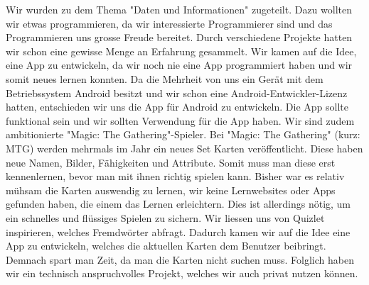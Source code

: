 Wir wurden zu dem Thema "Daten und Informationen" zugeteilt. Dazu wollten wir etwas programmieren, da wir interessierte Programmierer sind und das Programmieren uns grosse Freude bereitet. Durch verschiedene Projekte hatten wir schon eine gewisse Menge an Erfahrung gesammelt. Wir kamen auf die Idee, eine App zu entwickeln, da wir noch nie eine App programmiert haben und wir somit neues lernen konnten. Da die Mehrheit von uns ein Ger\"at mit dem Betriebssystem Android besitzt und wir schon eine Android-Entwickler-Lizenz hatten, entschieden wir uns die App f\"ur Android zu entwickeln. Die App sollte funktional sein und wir sollten Verwendung f\"ur die App haben. Wir sind zudem ambitionierte "Magic: The Gathering"-Spieler. Bei "Magic: The Gathering" (kurz: MTG) werden mehrmals im Jahr ein neues Set Karten ver\"offentlicht. Diese haben neue Namen, Bilder, Fähigkeiten und Attribute. Somit muss man diese erst kennenlernen, bevor man mit ihnen richtig spielen kann. Bisher war es relativ m\"uhsam die Karten auswendig zu lernen, wir keine Lernwebsites oder Apps gefunden haben, die einem das Lernen erleichtern. Dies ist allerdings n\"otig, um ein schnelles und fl\"ussiges Spielen zu sichern. Wir liessen uns von Quizlet inspirieren, welches Fremdw\"orter abfragt. Dadurch kamen wir auf die Idee eine App zu entwickeln, welches die aktuellen Karten dem Benutzer beibringt. Demnach spart man Zeit, da man die Karten nicht suchen muss. Folglich haben wir ein technisch anspruchvolles Projekt, welches wir auch privat nutzen k\"onnen.